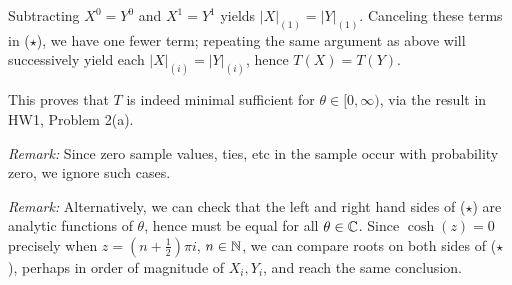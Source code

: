 \documentclass[11pt]{article}
\begin{document}
\begin{enumerate}
        Subtracting $X^0 = Y^0$ and $X^1 = Y^1$ yields $|X|_{(1)} = |Y|_{(1)}$.
        Canceling these terms in ($\star$), we have one fewer term; repeating
        the same argument as above will successively yield each $|X|_{(i)} =
        |Y|_{(i)}$, hence $T(X) = T(Y)$.

        This proves that $T$ is indeed minimal sufficient for $\theta \in [0,
        \infty)$, via the result in HW1, Problem 2(a).



        \emph{Remark:} Since zero sample values, ties, etc in the sample occur
        with probability zero, we ignore such cases.

        \emph{Remark:} Alternatively, we can check that the left and right hand
        sides of ($\star$) are analytic functions of $\theta$, hence must be
        equal for all $\theta \in \mathbb{C}$.
        Since $\cosh(z) = 0$ precisely when $z = (n + \frac{1}{2})\pi i$, $n
        \in \mathbb{N}$, we can compare roots on both sides of ($\star$), perhaps in
        order of magnitude of $X_i, Y_i$, and reach the same conclusion.





\end{enumerate}
\end{document}

